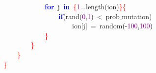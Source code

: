 \mbox{}\ \ \ \ \ \ \ \ \ \ \ \ \textbf{\textcolor{Blue}{for}}\ j\ \textbf{\textcolor{Blue}{in}}\ \textcolor{Red}{\{}\textcolor{Purple}{1}\textcolor{BrickRed}{...}length\textcolor{BrickRed}{(}ion\textcolor{BrickRed}{)}\textcolor{Red}{\}\{} \\
\mbox{}\ \ \ \ \ \ \ \ \ \ \ \ \ \ \ \ \textbf{\textcolor{Blue}{if}}\textcolor{BrickRed}{(}rand\textcolor{BrickRed}{(}\textcolor{Purple}{0}\textcolor{BrickRed}{,}\textcolor{Purple}{1}\textcolor{BrickRed}{)}\ \textcolor{BrickRed}{\textless{}}\ prob$\_$mutation\textcolor{BrickRed}{)} \\
\mbox{}\ \ \ \ \ \ \ \ \ \ \ \ \ \ \ \ \ \ \ \ ion\textcolor{BrickRed}{[}j\textcolor{BrickRed}{]}\ \textcolor{BrickRed}{=}\ random\textcolor{BrickRed}{(-}\textcolor{Purple}{100}\textcolor{BrickRed}{,}\textcolor{Purple}{100}\textcolor{BrickRed}{)} \\
\mbox{}\ \ \ \ \ \ \ \ \ \ \ \ \textcolor{Red}{\}} \\
\mbox{}\ \ \ \ \ \ \ \ \textcolor{Red}{\}} \\
\mbox{}\ \ \ \ \textcolor{Red}{\}} \\
\mbox{}\textcolor{Red}{\}} \\
\mbox{}
